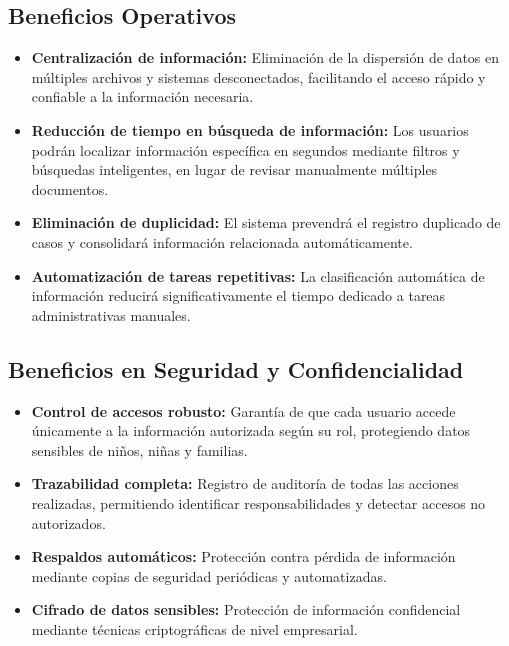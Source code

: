 \documentclass[12pt,letterpaper]{article}
\begin{document}
\subsection{Beneficios Operativos}

\begin{itemize}
    \item \textbf{Centralización de información:} Eliminación de la dispersión de datos en múltiples archivos y sistemas desconectados, facilitando el acceso rápido y confiable a la información necesaria.
    
    \item \textbf{Reducción de tiempo en búsqueda de información:} Los usuarios podrán localizar información específica en segundos mediante filtros y búsquedas inteligentes, en lugar de revisar manualmente múltiples documentos.
    
    \item \textbf{Eliminación de duplicidad:} El sistema prevendrá el registro duplicado de casos y consolidará información relacionada automáticamente.
    
    \item \textbf{Automatización de tareas repetitivas:} La clasificación automática de información reducirá significativamente el tiempo dedicado a tareas administrativas manuales.
\end{itemize}

\subsection{Beneficios en Seguridad y Confidencialidad}

\begin{itemize}
    \item \textbf{Control de accesos robusto:} Garantía de que cada usuario accede únicamente a la información autorizada según su rol, protegiendo datos sensibles de niños, niñas y familias.
    
    \item \textbf{Trazabilidad completa:} Registro de auditoría de todas las acciones realizadas, permitiendo identificar responsabilidades y detectar accesos no autorizados.
    
    \item \textbf{Respaldos automáticos:} Protección contra pérdida de información mediante copias de seguridad periódicas y automatizadas.
    
    \item \textbf{Cifrado de datos sensibles:} Protección de información confidencial mediante técnicas criptográficas de nivel empresarial.
\end{itemize}
\end{document}
